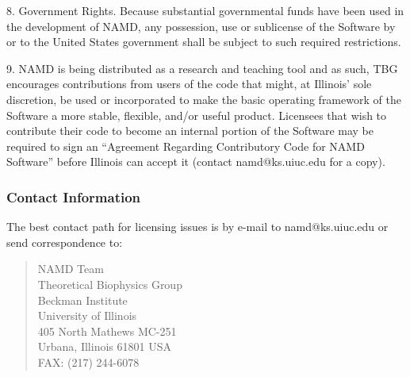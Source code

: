 8. Government Rights. Because substantial governmental funds have been 
used in the development of NAMD, any possession, use or sublicense of 
the Software by or to the United States government shall be subject 
to such required restrictions.

9. NAMD is being distributed as a research and teaching tool and as such, 
TBG encourages contributions from users of the code that might, at 
Illinois' sole discretion, be used or incorporated to make the basic 
operating framework of the Software a more stable, flexible, and/or 
useful product. Licensees that wish to contribute their code to become 
an internal portion of the Software may be required to sign an 
``Agreement Regarding Contributory Code for NAMD Software''
before Illinois can accept it (contact namd@ks.uiuc.edu for a copy).

\newpage
\subsubsection*{Contact Information}

The best contact path for licensing issues is by e-mail to namd@ks.uiuc.edu
or send correspondence to:
\begin{verse}
                             NAMD Team\\
                             Theoretical Biophysics Group\\
                             Beckman Institute\\
                             University of Illinois\\
                             405 North Mathews MC-251\\
                             Urbana, Illinois 61801 USA\\
                             FAX: (217) 244-6078
\end{verse}


